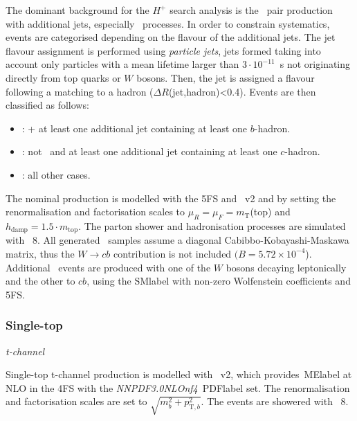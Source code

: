 The dominant background for the $H^+$ search analysis is the \ttbar\ pair production with additional jets, especially \ttb\ processes. In order to constrain systematics, events are categorised depending on the flavour of the additional jets. The jet flavour assignment is performed using \textit{particle jets}, jets formed taking into account only particles with a mean lifetime larger than $3\cdot10^{-11}$~s not originating directly from top quarks or $W$ bosons. Then, the jet is assigned a flavour following a matching to a hadron ($\Delta R$(jet,hadron)<0.4). Events are then classified as follows:
\begin{itemize}
    \item \ttb: \ttbar + at least one additional jet containing at least one $b$-hadron.
    \item \ttc: not \ttb\ and at least one additional jet containing at least one $c$-hadron.
    \item \ttl: all other cases.
\end{itemize}

The nominal production is modelled with the 5FS and \POWHEGBOX~v2 and by setting the renormalisation and factorisation scales to $\mu_R = \mu_F = m_\text{T}$(top) and $h_\text{damp}=1.5\cdot m_\text{top}$. The parton shower and hadronisation processes are simulated with \PYTHIA~8. All generated \ttbar\ samples assume a diagonal Cabibbo-Kobayashi-Maskawa matrix, thus the $W\to cb$ contribution is not included $(B = 5.72 \times 10^{-4}$). Additional \ttjets\ events are produced with one of the $W$ bosons decaying leptonically and the other to $cb$, using the \acrshort{SMlabel} with non-zero Wolfenstein coefficients and 5FS.

\subsubsection{Single-top}
\textit{t-channel}

Single-top t-channel production is modelled with \POWHEGBOX~v2, which provides~\acrshort{MElabel} at NLO in the 4FS with the \textit{NNPDF3.0NLOnf4}~\acrshort{PDFlabel} set. The renormalisation and factorisation scales are set to $\sqrt{m_b^2+p_{\text{T},b}^2}$. The events are showered with \PYTHIA~8.\\

